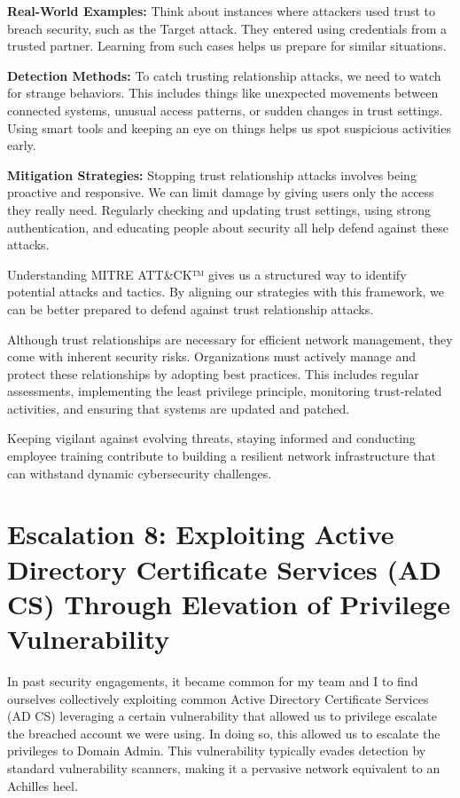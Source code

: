 \textbf{Real-World Examples:} Think about instances where attackers used trust to breach security, such as the Target attack. They entered using credentials from a trusted partner. Learning from such cases helps us prepare for similar situations.

\textbf{Detection Methods:} To catch trusting relationship attacks, we need to watch for strange behaviors. This includes things like unexpected movements between connected systems, unusual access patterns, or sudden changes in trust settings. Using smart tools and keeping an eye on things helps us spot suspicious activities early.

\textbf{Mitigation Strategies:} Stopping trust relationship attacks involves being proactive and responsive. We can limit damage by giving users only the access they really need. Regularly checking and updating trust settings, using strong authentication, and educating people about security all help defend against these attacks.

Understanding MITRE ATT\&CK™ gives us a structured way to identify potential attacks and tactics. By aligning our strategies with this framework, we can be better prepared to defend against trust relationship attacks.

 Although trust relationships are necessary for efficient network management, they come with inherent security risks. Organizations must actively manage and protect these relationships by adopting best practices. This includes regular assessments, implementing the least privilege principle, monitoring trust-related activities, and ensuring that systems are updated and patched.

Keeping vigilant against evolving threats, staying informed and conducting employee training contribute to building a resilient network infrastructure that can withstand dynamic cybersecurity challenges.

 
 




\chapter{Escalation 8: Exploiting Active Directory Certificate Services (AD CS) Through Elevation of Privilege Vulnerability}

In past security engagements, it became common for my team and I to find ourselves collectively exploiting common Active Directory Certificate Services (AD CS) leveraging a certain vulnerability that allowed us to privilege escalate the breached account we were using. In doing so, this allowed us to escalate the privileges to Domain Admin. This vulnerability typically evades detection by standard vulnerability scanners, making it a pervasive network equivalent to an Achilles heel.

